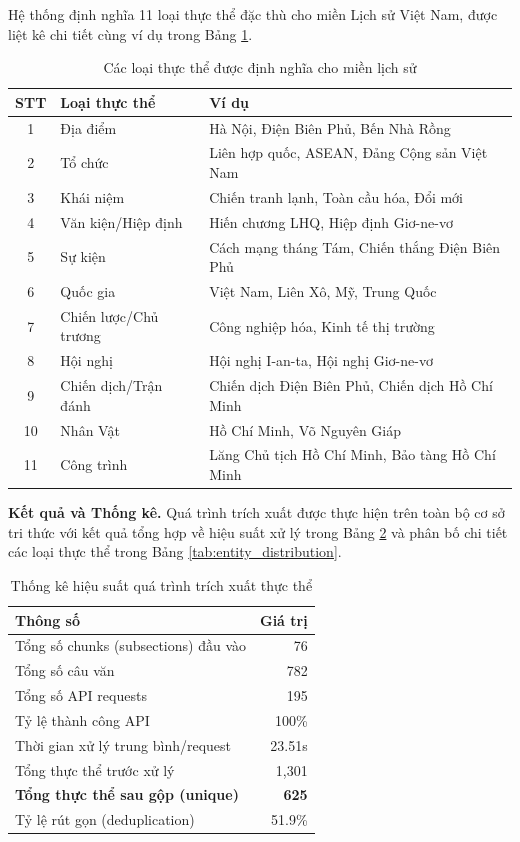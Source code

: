 \noindent Hệ thống định nghĩa 11 loại thực thể đặc thù cho miền Lịch sử Việt Nam, được liệt kê chi tiết cùng ví dụ trong Bảng \ref{tab:entity_types}.

\begin{table}[H]
\centering
\caption{Các loại thực thể được định nghĩa cho miền lịch sử}
\begin{tabular}{|c|l|p{7.5cm}|}
\hline
\textbf{STT} & \textbf{Loại thực thể} & \textbf{Ví dụ} \\
\hline
1 & Địa điểm & Hà Nội, Điện Biên Phủ, Bến Nhà Rồng \\
\hline
2 & Tổ chức & Liên hợp quốc, ASEAN, Đảng Cộng sản Việt Nam \\
\hline
3 & Khái niệm & Chiến tranh lạnh, Toàn cầu hóa, Đổi mới \\
\hline
4 & Văn kiện/Hiệp định & Hiến chương LHQ, Hiệp định Giơ-ne-vơ \\
\hline
5 & Sự kiện & Cách mạng tháng Tám, Chiến thắng Điện Biên Phủ \\
\hline
6 & Quốc gia & Việt Nam, Liên Xô, Mỹ, Trung Quốc \\
\hline
7 & Chiến lược/Chủ trương & Công nghiệp hóa, Kinh tế thị trường \\
\hline
8 & Hội nghị & Hội nghị I-an-ta, Hội nghị Giơ-ne-vơ \\
\hline
9 & Chiến dịch/Trận đánh & Chiến dịch Điện Biên Phủ, Chiến dịch Hồ Chí Minh \\
\hline
10 & Nhân Vật & Hồ Chí Minh, Võ Nguyên Giáp \\
\hline
11 & Công trình & Lăng Chủ tịch Hồ Chí Minh, Bảo tàng Hồ Chí Minh \\
\hline
\end{tabular}
\label{tab:entity_types}
\end{table}

\noindent \textbf{Kết quả và Thống kê.} Quá trình trích xuất được thực hiện trên toàn bộ cơ sở tri thức với kết quả tổng hợp về hiệu suất xử lý trong Bảng \ref{tab:extraction_stats} và phân bố chi tiết các loại thực thể trong Bảng \ref{tab:entity_distribution}.

\begin{table}[H]
\centering
\caption{Thống kê hiệu suất quá trình trích xuất thực thể}
\begin{tabular}{|l|r|}
\hline
\textbf{Thông số} & \textbf{Giá trị} \\
\hline
Tổng số chunks (subsections) đầu vào & 76 \\
Tổng số câu văn & 782 \\
Tổng số API requests & 195 \\
Tỷ lệ thành công API & 100\% \\
Thời gian xử lý trung bình/request & 23.51s \\
\hline
Tổng thực thể trước xử lý & 1{,}301 \\
\textbf{Tổng thực thể sau gộp (unique)} & \textbf{625} \\
Tỷ lệ rút gọn (deduplication) & 51.9\% \\
\hline
\end{tabular}
\label{tab:extraction_stats}
\end{table}

